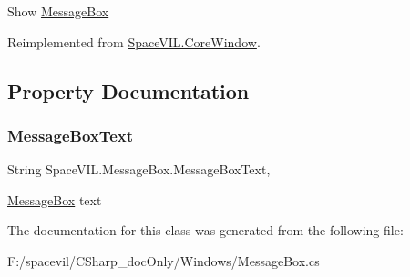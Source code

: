 Show \mbox{\hyperlink{class_space_v_i_l_1_1_message_box}{Message\+Box}} 



Reimplemented from \mbox{\hyperlink{class_space_v_i_l_1_1_core_window_a6f25e26e98c54d56d93b0abfc88af3c0}{Space\+V\+I\+L.\+Core\+Window}}.



\subsection{Property Documentation}
\mbox{\label{class_space_v_i_l_1_1_message_box_a17b1d957b5a8835a4dc60b0e59067ab0}} 
\subsubsection{\texorpdfstring{Message\+Box\+Text}{MessageBoxText}}
{\footnotesize\ttfamily String Space\+V\+I\+L.\+Message\+Box.\+Message\+Box\+Text\hspace{0.3cm}{\ttfamily [get]}, {\ttfamily [set]}}



\mbox{\hyperlink{class_space_v_i_l_1_1_message_box}{Message\+Box}} text 



The documentation for this class was generated from the following file\+:\begin{DoxyCompactItemize}
\item 
F\+:/spacevil/\+C\+Sharp\+\_\+doc\+Only/\+Windows/Message\+Box.\+cs\end{DoxyCompactItemize}
